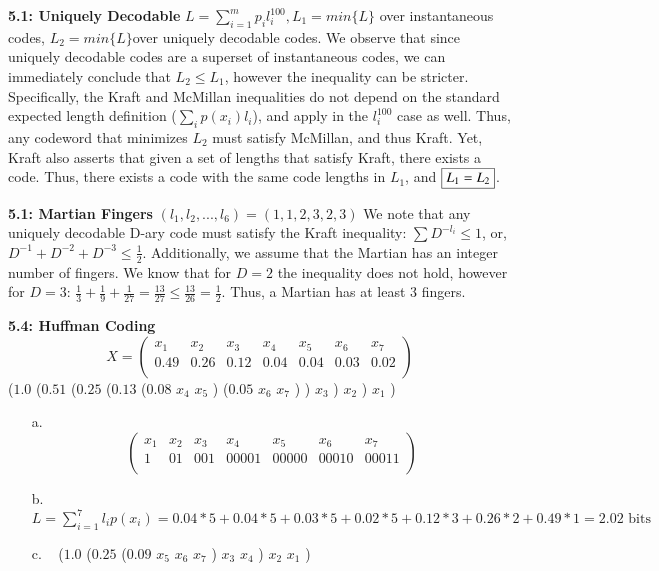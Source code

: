 \documentclass[10pt]{article}
\begin{document}
\begin{tiny}
\begin{multicols}{3}
\textbf{5.1: Uniquely Decodable}
$L = \sum_{i=1}^m p_i l_i^{100}, L_1 = min\{L\}$ over instantaneous codes, $L_2 = min\{L\} $over uniquely decodable codes. We observe that since uniquely decodable codes are a superset of instantaneous codes, we can immediately conclude that $L_2 \leq L_1$, however the inequality can be stricter. Specifically, the Kraft and McMillan inequalities do not depend on the standard expected length definition ($\sum_i p(x_i)l_i$), and apply in the $l_i^{100}$ case as well. Thus, any codeword that minimizes $L_2$ must satisfy McMillan, and thus Kraft. Yet, Kraft also asserts that given a set of lengths that satisfy Kraft, there exists a code. Thus, there exists a code with the same code lengths in $L_1$, and $\fbox{$L_1 = L_2$}$.

\textbf{5.1: Martian Fingers}
$(l_1,l_2,...,l_6) = (1,1,2,3,2,3)$ We note that any uniquely decodable D-ary code must satisfy the Kraft inequality: $\sum D^{-l_i} \leq 1$, or, $D^{-1} + D^{-2} + D^{-3} \leq \frac{1}{2}$. Additionally, we assume that the Martian has an integer number of fingers. We know that for $D=2$ the inequality does not hold, however for $D=3$: $\frac{1}{3} + \frac{1}{9} + \frac{1}{27} = \frac{13}{27} \leq  \frac{13}{26} = \frac{1}{2}$. Thus, a Martian has at least $3$ fingers.

\textbf{5.4: Huffman Coding}
\[
 X =
 \begin{pmatrix}
	x_1 & x_2 & x_3 & x_4 & x_5 & x_6 & x_7 \\
	0.49 & 0.26 & 0.12 & 0.04 & 0.04 & 0.03 & 0.02 \\
 \end{pmatrix}
\]
($1.0$ ($0.51$ ($0.25$ ($0.13$ ($0.08$ $x_4$ $x_5$ ) ($0.05$ $x_6$ $x_7$ ) ) $x_3$ ) $x_2$ ) $x_1$ )
\begin{itemize}
	\item[a.] 
\[
 \begin{pmatrix}
	x_1 & x_2 & x_3 & x_4   & x_5   & x_6   & x_7 \\
	1   & 01  & 001 & 00001 & 00000 & 00010 & 00011 \\
 \end{pmatrix}
\]
	\item[b.] $L = \sum_{i=1}^7 l_i p(x_i) = 0.04*5 + 0.04*5 + 0.03*5 + 0.02*5 + 0.12*3 + 0.26*2 + 0.49*1 = 2.02\textrm{ bits}$

	\item[c.] 
\
($1.0$  ($0.25$ ($0.09$ $x_5$ $x_6$ $x_7$ ) $x_3$ $x_4$ ) $x_2$ $x_1$ )


\end{itemize}
\end{multicols}
\end{tiny}
\end{document}
